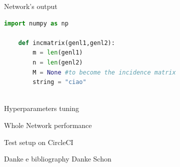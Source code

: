 \documentclass{beamer}
\begin{document}
\begin{frame}[fragile]{Network's output}
    \begin{lstlisting}[language=Python]
    import numpy as np
        
    def incmatrix(genl1,genl2):
        m = len(genl1)
        n = len(genl2)
        M = None #to become the incidence matrix
        string = "ciao"
      
    \end{lstlisting}

    
\end{frame}

\begin{frame}{Hyperparameters tuning}

    
\end{frame}


\begin{frame}{Whole Network performance}

    
\end{frame}

\begin{frame}{Test setup on CircleCI}

    
\end{frame}

\begin{frame}{Danke e bibliography}
\centering
Danke Schon

    
\end{frame}
\end{document}
